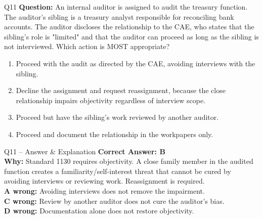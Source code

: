 \documentclass[aspectratio=169,10pt]{beamer}
\begin{document}
	\begin{frame}[t]{Q11}
		\small
		\textbf{Question:} An internal auditor is assigned to audit the treasury function. The auditor's sibling is a treasury analyst responsible for reconciling bank accounts. The auditor discloses the relationship to the CAE, who states that the sibling's role is "limited" and that the auditor can proceed as long as the sibling is not interviewed. Which action is MOST appropriate?
		\begin{enumerate}[label=\Alph*.,itemsep=1pt,topsep=2pt]
			\item Proceed with the audit as directed by the CAE, avoiding interviews with the sibling.
			\item Decline the assignment and request reassignment, because the close relationship impairs objectivity regardless of interview scope.
			\item Proceed but have the sibling's work reviewed by another auditor.
			\item Proceed and document the relationship in the workpapers only.
		\end{enumerate}
	\end{frame}
	
	\begin{frame}[t]{Q11 -- Answer \& Explanation}
		\small
		\textbf{Correct Answer: B} \\[4pt]
		\textbf{Why:} Standard 1130 requires objectivity. A close family member in the audited function creates a familiarity/self-interest threat that cannot be cured by avoiding interviews or reviewing work. Reassignment is required. \\[4pt]
		\textbf{A wrong:} Avoiding interviews does not remove the impairment. \\[2pt]
		\textbf{C wrong:} Review by another auditor does not cure the auditor's bias. \\[2pt]
		\textbf{D wrong:} Documentation alone does not restore objectivity.
	\end{frame}
	
\end{document}
